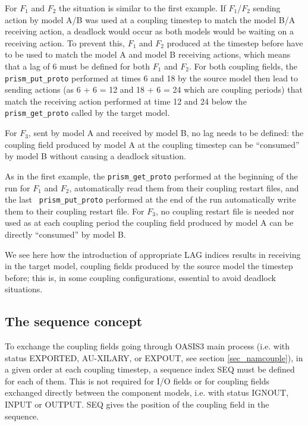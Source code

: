 \begin{enumerate}
  For $F_1$ and $F_2$ the situation is similar to the first
  example. If $F_1$/$F_2$ sending action by model A/B was used at a
  coupling timestep to match the model B/A receiving action, a
  deadlock would occur as both models would be waiting on a receiving
  action. To prevent this, $F_1$ and $F_2$ produced at the timestep
  before have to be used to match the model A and model B receiving
  actions, which means that a lag of 6 must be defined for both $F_1$
  and $F_2$. For both coupling fields, the {\tt prism\_put\_proto}
  performed at times 6 and 18 by the source model then lead to sending
  actions (as 6 + 6 = 12 and 18 + 6 = 24 which are coupling periods)
  that match the receiving action performed at time 12 and 24 below
  the {\tt prism\_get\_proto} called by the target model.

  For $F_3$, sent by model A and received by model B, no lag
  needs to be defined: the coupling field produced by model A at the
  coupling timestep can be ``consumed'' by model B without causing a
  deadlock situation.

  As in the first example, the {\tt prism\_get\_proto} performed at
  the beginning of the run for $F_1$ and $F_2$, automatically read
  them from their coupling restart files, and the last {\tt
  prism\_put\_proto} performed at the end of the run automatically
  write them to their coupling restart file. For $F_3$, no coupling
  restart file is needed nor used as at each coupling period the
  coupling field produced by model A can be directly ``consumed'' by
  model B.

  We see here how the introduction of appropriate LAG indices results in
  receiving in the target model,
  coupling fields produced by the
  source model the timestep before; this is, in some coupling
  configurations, essential to avoid deadlock situations.

  \end{enumerate}

\subsection{The sequence concept}
 
To exchange the coupling fields going through OASIS3 main process
(i.e. with status EXPORTED, AU-\newline XILARY, or EXPOUT, see section
\ref{sec_namcouple}), in a given order at each coupling timestep, a
sequence index SEQ must be defined for each of them. This is not
required for I/O fields or for coupling fields exchanged directly
between the component models, i.e. with status IGNOUT, INPUT or
OUTPUT. SEQ gives the position of the coupling field in the
sequence.


